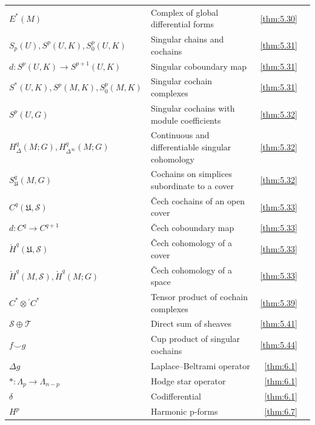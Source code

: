 {\begin{longtable}{@{}>{\raggedright\arraybackslash}p{.39\linewidth}>{\raggedright\arraybackslash}p{.39\linewidth}r r@{}}
$E^{*}(M)$ & Complex of global differential forms & \ref{thm:5.30} & \pageref{thm:5.30} \\
$S_{p}(U),\allowbreak S^{p}(U,\allowbreak K),\allowbreak S_{0}^{p}(U,\allowbreak K)$ & Singular chains and cochains & \ref{thm:5.31} & \pageref{thm:5.31} \\
$d:S^{p}(U,\allowbreak K)\to S^{p+1}(U,\allowbreak K)$ & Singular coboundary map & \ref{thm:5.31} & \pageref{thm:5.31} \\
$S^{*}(U,\allowbreak K),\allowbreak S^{p}(M,\allowbreak K),\allowbreak S_{0}^{p}(M,\allowbreak K)$ & Singular cochain complexes & \ref{thm:5.31} & \pageref{thm:5.31} \\
$S^{p}(U,\allowbreak G)$ & Singular cochains with module coefficients & \ref{thm:5.32} & \pageref{thm:5.32} \\
$H_\Delta^q(M;G),\allowbreak H_{\Delta^\infty}^q(M;G)$ & Continuous and differentiable singular cohomology & \ref{thm:5.32} & \pageref{thm:5.32} \\
$S_{\mathfrak U}^q(M,\allowbreak G)$ & Cochains on simplices subordinate to a cover & \ref{thm:5.32} & \pageref{thm:5.32} \\
$C^q(\mathfrak U,\allowbreak \mathcal S)$ & Čech cochains of an open cover & \ref{thm:5.33} & \pageref{thm:5.33} \\
$d:C^q\to C^{q+1}$ & Čech coboundary map & \ref{thm:5.33} & \pageref{thm:5.33} \\
$\check H^q(\mathfrak U,\allowbreak \mathcal S)$ & Čech cohomology of a cover & \ref{thm:5.33} & \pageref{thm:5.33} \\
$\check H^q(M,\allowbreak \mathcal S),\allowbreak \check H^q(M;G)$ & Čech cohomology of a space & \ref{thm:5.33} & \pageref{thm:5.33} \\
$C^*\otimes {}^{\prime}C^*$ & Tensor product of cochain complexes & \ref{thm:5.39} & \pageref{thm:5.39} \\
$\mathcal S\oplus\mathcal T$ & Direct sum of sheaves & \ref{thm:5.41} & \pageref{thm:5.41} \\
$f\smile g$ & Cup product of singular cochains & \ref{thm:5.44} & \pageref{thm:5.44} \\
$\Delta g$ & Laplace--Beltrami operator & \ref{thm:6.1} & \pageref{thm:6.1} \\
$\ast:\Lambda_p\to\Lambda_{n-p}$ & Hodge star operator & \ref{thm:6.1} & \pageref{thm:6.1} \\
$\delta$ & Codifferential & \ref{thm:6.1} & \pageref{thm:6.1} \\
$H^p$ & Harmonic p-forms & \ref{thm:6.7} & \pageref{thm:6.7} \\

\end{longtable}}

